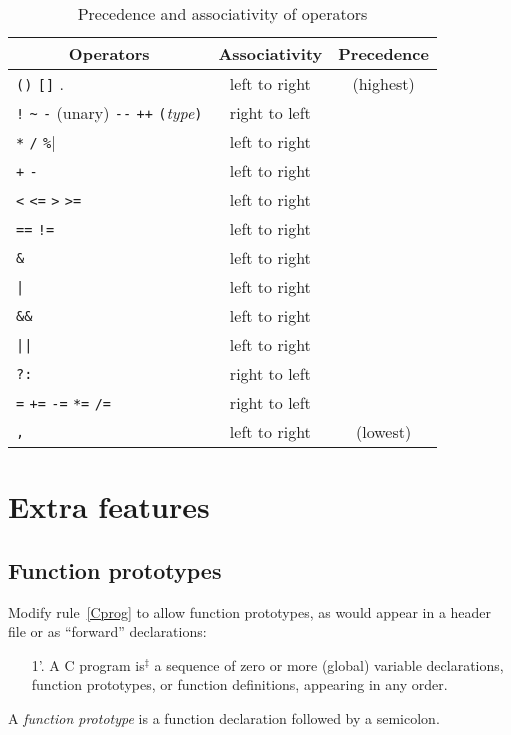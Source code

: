 \documentclass{article}
\newcommand{\isextra}{is$^\ddagger$ }
\begin{document}
\begin{table}[t]
\begin{center}
\begin{tabular}{@{}l|c|c}
\hline
  \multicolumn{1}{c|}{\sc Operators}
&
  {\sc Associativity}
&
  {\sc Precedence}
\\ \hline
  \verb|()| \quad \verb|[]| \quad .
  &
  left to right
  &
  (highest)
\\
  \verb|!| \quad \verb|~| \quad \verb|-| (unary)
  \quad \verb|--| \quad \verb|++|
  \quad \verb|(|\emph{type}\verb|)|
  &
  right to left
\\
  \verb|*| \quad \verb|/| \quad \verb|%|
  &
  left to right
\\
  \verb|+| \quad \verb|-|
  &
  left to right
\\
  \verb|<| \quad \verb|<=| \quad \verb|>| \quad \verb|>=|
  &
  left to right
\\
  \verb|==| \quad \verb|!=|
  &
  left to right
\\
  \verb|&|
  &
  left to right
\\
  \verb$|$
  &
  left to right
\\
  \verb|&&|
  &
  left to right
\\
  \verb$||$
  &
  left to right
\\
  \verb$?:$
  &
  right to left
\\
  \verb|=| \quad \verb|+=| \quad \verb|-=| \quad \verb|*=| \quad \verb|/=|
  &
  right to left
\\
  \verb|,|
  &
  left to right
  &
  (lowest)
\\ \hline
\end{tabular}
\end{center}
\caption{Precedence and associativity of operators}
\label{TAB:precedence}
\end{table}

\section{Extra features}
\label{SEC:extra}

\subsection{Function prototypes}
\label{SEC:prototypes}

Modify rule~\ref{Cprog} to allow function prototypes,
as would appear in a header file or as ``forward'' declarations:
\begin{enumerate}
\item[1'.]
  A C program \isextra a sequence of zero or more
  (global) variable declarations, function prototypes,
  or function definitions,
  appearing in any order.
\end{enumerate}
A \emph{function prototype} is a function declaration
followed by a semicolon.
\end{document}
